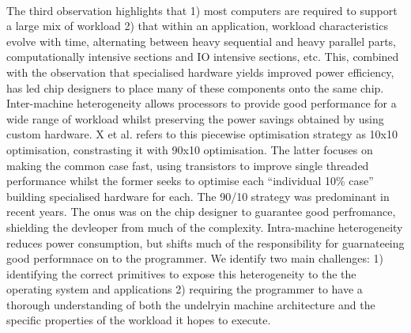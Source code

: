 \paragraph{} The third observation highlights that 1) most computers are 
required to support a large mix of workload 2) that within an application, workload characteristics evolve with time, alternating between heavy sequential and heavy parallel parts, computationally intensive sections and IO intensive sections, etc. This, combined with the observation that specialised hardware yields improved power efficiency, has led chip designers to place many of these components onto the same chip. Inter-machine heterogeneity allows processors to provide good performance for a wide range of workload whilst preserving the power savings obtained by using custom hardware.  X et al. refers to this piecewise
optimisation strategy as 10x10 optimisation, constrasting it with 90x10 optimisation. The latter focuses on making the common case fast, using transistors to improve single threaded performance whilst the former
seeks to optimise each ``individual 10\% case'' building specialised hardware for each. The 90/10 strategy was predominant in recent years. The onus was on the chip designer to guarantee good perfromance, shielding the devleoper from much of the complexity. Intra-machine heterogeneity reduces power consumption, but shifts much of the responsibility for guarnateeing good performnace on to the programmer. We identify two main challenges: 1) identifying the correct primitives to expose this heterogeneity to the the operating system and applications 2) requiring the programmer to have a thorough understanding of both the undelryin machine architecture and the specific properties of the workload it hopes to execute.  

